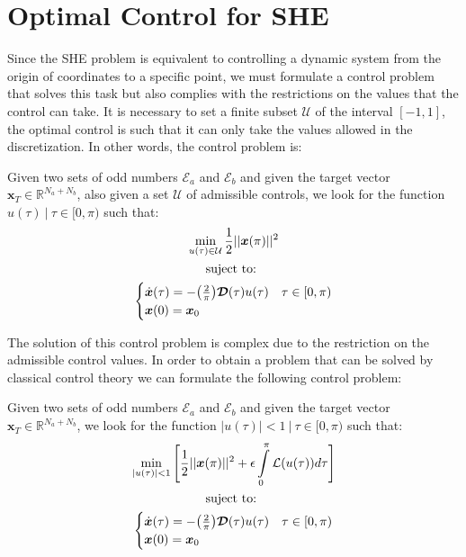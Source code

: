 \section{Optimal Control for SHE}\label{Section4}

Since the SHE problem is equivalent to controlling a dynamic system from the origin of coordinates to a specific point, we must formulate a control problem that solves this task but also complies with the restrictions on the values that the control can take. It is necessary to set a finite subset $ \mathcal {U} $ of the interval $ [- 1,1] $, the optimal control is such that it can only take the values allowed in the discretization. In other words, the control problem is:
\newline
\begin{problem}\label{OCP1}
    Given two sets of odd numbers $ \mathcal {E} _a $ and $ \mathcal {E} _b $ and given the target vector $ \bm {x} _T \in \mathbb {R} ^ {N_a + N_b} $, also given a set $ \mathcal {U} $ of admissible controls, we look for the function $ u (\tau) \ | \ \tau \in [0, \pi) $ such that:
    \begin{gather}
        \min_{u(\tau) \in \mathcal{U}}         
         \frac{1}{2}|| \bm{x}(\pi)  ||^2   \\
        \notag \text{suject to: } \\
        \begin{cases}
            \dot{\bm{x}}(\tau) = -\big(\frac{2}{\pi}\big)\bm{\mathcal{D}}(\tau) u(\tau)  & \tau \in [0,\pi)\\
            \bm{x}(0) = \bm{x}_0
        \end{cases}
    \end{gather}
\end{problem}
%
The solution of this control problem is complex due to the restriction on the admissible control values.
%
In order to obtain a problem that can be solved by classical control theory we can formulate the following control problem:
\newline
\begin{problem}\label{OCP2}
    Given two sets of odd numbers $ \mathcal {E} _a $ and $ \mathcal {E} _b $ and given the target vector $ \bm {x} _T \in \mathbb {R} ^ {N_a + N_b} $, we look for the function $ |u (\tau)|<1 \ | \ \tau \in [0, \pi) $ such that:
    \begin{gather}
        \min_{|u(\tau) |<1}         
         \Bigg[ \frac{1}{2}|| \bm{x}(\pi)  ||^2  
        + \epsilon \int_0^{\pi} \mathcal{L}(u(\tau)) d\tau \Bigg]  \\
        \notag \text{suject to: } \\
        \begin{cases}
            \dot{\bm{x}}(\tau) = -\big(\frac{2}{\pi}\big)\bm{\mathcal{D}}(\tau) u(\tau)  & \tau \in [0,\pi)\\
            \bm{x}(0) = \bm{x}_0
        \end{cases}
    \end{gather}
\end{problem}
